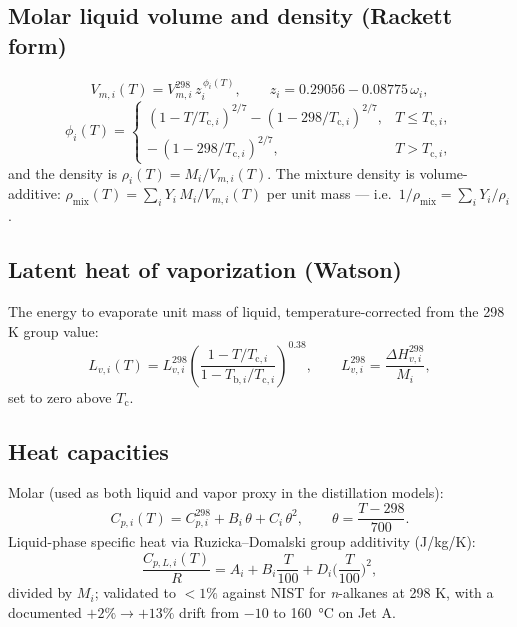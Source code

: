 \documentclass[11pt]{article}
\newcommand{\Tc}{T_{\mathrm{c}}}
\begin{document}
\subsection{Molar liquid volume and density (Rackett form)}
\begin{equation}
  V_{m,i}(T) = V_{m,i}^{298}\, z_i^{\,\phi_i(T)},\qquad
  z_i = 0.29056 - 0.08775\,\omega_i,
\end{equation}
\begin{equation}
  \phi_i(T) =
  \begin{cases}
    (1 - T/T_{\mathrm{c},i})^{2/7} - (1 - 298/T_{\mathrm{c},i})^{2/7}, & T \le T_{\mathrm{c},i},\\[2pt]
    -\,(1 - 298/T_{\mathrm{c},i})^{2/7}, & T > T_{\mathrm{c},i},
  \end{cases}
\end{equation}
and the density is $\rho_i(T) = M_i / V_{m,i}(T)$. The mixture density is
volume-additive: $\rho_{\mathrm{mix}}(T) = \sum_i Y_i\, M_i/V_{m,i}(T)$
per unit mass --- i.e.\ $1/\rho_{\mathrm{mix}} = \sum_i Y_i/\rho_i$.

\subsection{Latent heat of vaporization (Watson)}
The energy to evaporate unit mass of liquid, temperature-corrected from the
298 K group value:
\begin{equation}
  L_{v,i}(T) = L_{v,i}^{298}
  \left( \frac{1 - T/T_{\mathrm{c},i}}{1 - T_{\mathrm{b},i}/T_{\mathrm{c},i}} \right)^{0.38},
  \qquad L_{v,i}^{298} = \frac{\Delta H_{v,i}^{298}}{M_i},
\end{equation}
set to zero above $\Tc$.

\subsection{Heat capacities}
Molar (used as both liquid and vapor proxy in the distillation models):
\begin{equation}
  C_{p,i}(T) = C_{p,i}^{298} + B_i\,\theta + C_i\,\theta^2,
  \qquad \theta = \frac{T - 298}{700}.
\end{equation}
Liquid-phase specific heat via Ruzicka--Domalski group additivity
(\si{J/kg/K}):
\begin{equation}
  \frac{C_{p,L,i}(T)}{R} = A_i + B_i \frac{T}{100}
  + D_i \Big(\frac{T}{100}\Big)^2 ,
\end{equation}
divided by $M_i$; validated to $<1\%$ against NIST for
\emph{n}-alkanes at 298 K, with a documented $+2\%\to+13\%$ drift from
$-10$ to \SI{160}{\celsius} on Jet A.
\end{document}
